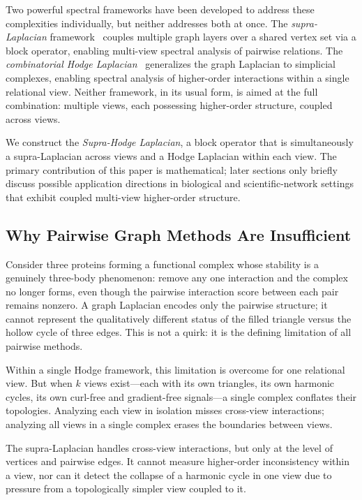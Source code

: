 \documentclass[11pt]{article}
\theoremstyle{definition}
\theoremstyle{remark}
\begin{document}
Two powerful spectral frameworks have been developed to address these
complexities individually, but neither addresses both at once. The
\emph{supra-Laplacian} framework~\cite{gomez2013,dedomenico2013} couples
multiple graph layers over a shared vertex set via a block operator, enabling
multi-view spectral analysis of pairwise relations. The \emph{combinatorial
Hodge Laplacian}~\cite{horak2013,schaub2020,lim2020} generalizes the graph
Laplacian to simplicial complexes, enabling spectral analysis of higher-order
interactions within a single relational view. Neither framework, in its usual form, is aimed at the full combination:
multiple views, each possessing higher-order structure, coupled across views.

We construct the \emph{Supra-Hodge Laplacian}, a block operator that is
simultaneously a supra-Laplacian across views and a Hodge Laplacian within each
view. The primary contribution of this paper is mathematical; later sections only briefly discuss possible application directions in biological and scientific-network settings that exhibit coupled multi-view higher-order structure.

\subsection{Why Pairwise Graph Methods Are Insufficient}
\label{subsec:insufficient}

Consider three proteins forming a functional complex whose stability is a genuinely three-body phenomenon: remove any one interaction and the complex no longer forms, even though the pairwise interaction score between each pair remains nonzero. A graph Laplacian encodes only the pairwise structure; it cannot represent the qualitatively different status of the filled triangle versus the hollow cycle of three edges. This is not a quirk: it is the defining limitation of all pairwise methods.

Within a single Hodge framework, this limitation is overcome for one relational
view. But when $k$ views exist---each with its own triangles, its own harmonic
cycles, its own curl-free and gradient-free signals---a single complex conflates
their topologies. Analyzing each view in isolation misses cross-view
interactions; analyzing all views in a single complex erases the boundaries
between views.

The supra-Laplacian handles cross-view interactions, but only at the level of
vertices and pairwise edges. It cannot measure higher-order inconsistency
within a view, nor can it detect the collapse of a harmonic cycle in one view
due to pressure from a topologically simpler view coupled to it.
\end{document}
